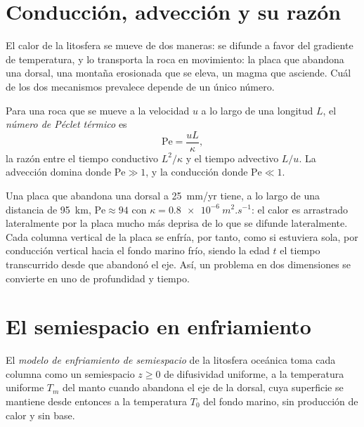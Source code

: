 \section{Conducción, advección y su razón}

El calor de la litosfera se mueve de dos maneras: se difunde a favor del gradiente de temperatura,
y lo transporta la roca en movimiento: la placa que abandona una dorsal, una
montaña erosionada que se eleva, un magma que asciende. Cuál de los dos mecanismos prevalece
depende de un único número.

\begin{definition}\label{def:b3:lithosphere-thermal-models:peclet}
Para una roca que se mueve a la velocidad $u$ a lo largo de una longitud $L$, el \emph{número de Péclet
térmico} es
\[
  \mathrm{Pe} = \frac{uL}{\kappa},
\]
la razón entre el tiempo conductivo $L^2/\kappa$ y el tiempo advectivo $L/u$.
La advección domina donde $\mathrm{Pe} \gg 1$, y la conducción donde
$\mathrm{Pe} \ll 1$.
\end{definition}

Una placa que abandona una dorsal a \qty{25}{mm/yr} tiene, a lo largo de una distancia de
\qty{95}{km}, $\mathrm{Pe} \approx 94$ con $\kappa = \qty{0.8e-6}{m^2.s^{-1}}$:
el calor es arrastrado lateralmente por la placa mucho más deprisa de lo que se difunde lateralmente.
Cada columna vertical de la placa se enfría, por tanto, como si estuviera sola, por conducción vertical
hacia el fondo marino frío, siendo la edad $t$ el tiempo transcurrido desde que
abandonó el eje. Así, un problema en dos dimensiones se convierte en uno de profundidad
y tiempo.

\section{El semiespacio en enfriamiento}

\begin{definition}\label{def:b3:lithosphere-thermal-models:half-space}
El \emph{modelo de enfriamiento de semiespacio} de la
litosfera oceánica toma cada columna como un semiespacio $z \ge 0$ de difusividad uniforme,
a la temperatura uniforme $T_m$ del manto cuando abandona el
eje de la dorsal, cuya superficie se mantiene desde entonces a la temperatura $T_0$ del
fondo marino, sin producción de calor y sin base.
\end{definition}

